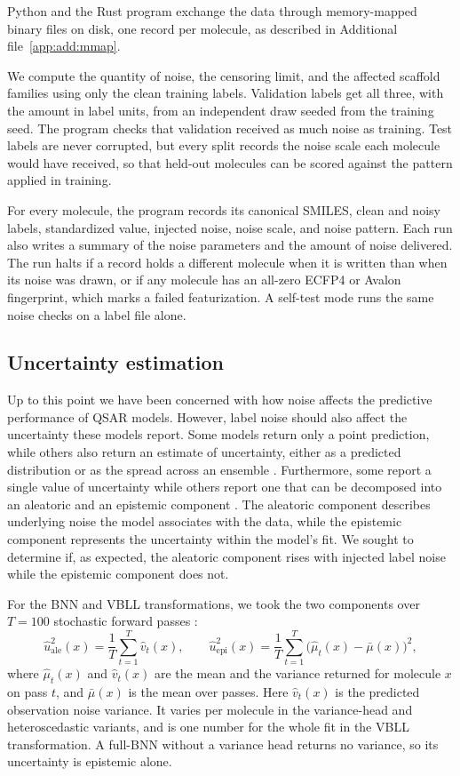 Python and the Rust program exchange the data through memory-mapped binary files on disk, one record per molecule, as described in Additional file~\ref{app:add:mmap}.

We compute the quantity of noise, the censoring limit, and the affected scaffold families using only the clean training labels. Validation labels get all three, with the amount in label units, from an independent draw seeded from the training seed. The program checks that validation received as much noise as training. Test labels are never corrupted, but every split records the noise scale each molecule would have received, so that held-out molecules can be scored against the pattern applied in training.

For every molecule, the program records its canonical SMILES, clean and noisy labels, standardized value, injected noise, noise scale, and noise pattern. Each run also writes a summary of the noise parameters and the amount of noise delivered. The run halts if a record holds a different molecule when it is written than when its noise was drawn, or if any molecule has an all-zero ECFP4 or Avalon fingerprint, which marks a failed featurization. A self-test mode runs the same noise checks on a label file alone.

\subsection{Uncertainty estimation}

Up to this point we have been concerned with how noise affects the predictive performance of QSAR models. However, label noise should also affect the uncertainty these models report. Some models return only a point prediction, while others also return an estimate of uncertainty, either as a predicted distribution or as the spread across an ensemble \citep{Lanini2024UNIQUE}. Furthermore, some report a single value of uncertainty while others report one that can be decomposed into an aleatoric and an epistemic component \citep{kendall2017}. The aleatoric component describes underlying noise the model associates with the data, while the epistemic component represents the uncertainty within the model's fit. We sought to determine if, as expected, the aleatoric component rises with injected label noise while the epistemic component does not.

For the BNN and VBLL transformations, we took the two components over $T = 100$ stochastic forward
passes \citep{kendall2017}:
\begin{equation}
\hat{u}^2_{\text{ale}}(x) = \frac{1}{T}\sum_{t=1}^{T}\hat{v}_t(x),
\qquad
\hat{u}^2_{\text{epi}}(x) = \frac{1}{T}\sum_{t=1}^{T}\big(\hat{\mu}_t(x) - \bar{\mu}(x)\big)^2 ,
\label{eq:sampling_split}
\end{equation}
where $\hat{\mu}_t(x)$ and $\hat{v}_t(x)$ are the mean and the variance returned for molecule $x$ on
pass $t$, and $\bar{\mu}(x)$ is the mean over passes. Here $\hat{v}_t(x)$ is the predicted observation
noise variance. It varies per molecule in the variance-head and heteroscedastic variants, and is one
number for the whole fit in the VBLL transformation. A full-BNN without a variance head returns no
variance, so its uncertainty is epistemic alone.

